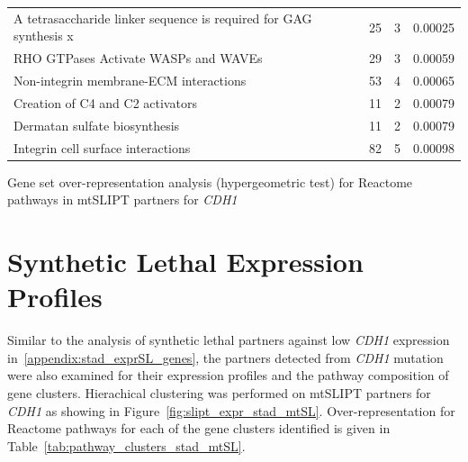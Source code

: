 \begin{table}[!ht]
{\begin{threeparttable}
\begin{tabular}{lccc}
  A tetrasaccharide linker sequence is required for GAG synthesis \textcolor{black!10}{x} &  25 &   3 & 0.00025 \\ 
  \rowcolor{black!5}
  RHO GTPases Activate WASPs and WAVEs &  29 &   3 & 0.00059 \\ 
  \rowcolor{black!10}
  Non-integrin membrane-ECM interactions &  53 &   4 & 0.00065 \\ 
  \rowcolor{black!5}
  Creation of C4 and C2 activators &  11 &   2 & 0.00079 \\ 
  \rowcolor{black!10}
  Dermatan sulfate biosynthesis &  11 &   2 & 0.00079 \\ 
  \rowcolor{black!5}
  Integrin cell surface interactions &  82 &   5 & 0.00098 \\ 
  \hline
\end{tabular}
\begin{tablenotes}
\raggedright \small
Gene set over-representation analysis (hypergeometric test) for Reactome pathways in mtSLIPT partners for \textit{CDH1}
\end{tablenotes}
\end{threeparttable}
}
\end{table}


\FloatBarrier

\section{Synthetic Lethal Expression Profiles} \label{appendix:stad_mtSL_clusters}

Similar to the analysis of synthetic lethal partners against low \textit{CDH1} expression in~\ref{appendix:stad_exprSL_genes}, the partners detected from \textit{CDH1} mutation were also examined for their expression profiles and the pathway composition of gene clusters. Hierachical clustering was performed on mtSLIPT partners for \textit{CDH1} as showing in Figure~\ref{fig:slipt_expr_stad_mtSL}. Over-representation for Reactome pathways for each of the gene clusters identified is given in Table~\ref{tab:pathway_clusters_stad_mtSL}.


